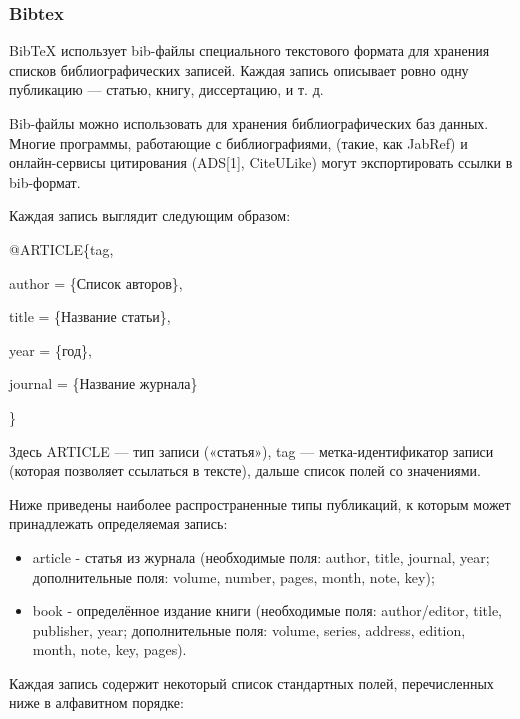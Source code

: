 \subsubsection{Bibtex}

BibTeX использует bib-файлы специального текстового формата для хранения списков библиографических записей. Каждая запись описывает ровно одну публикацию — статью, книгу, диссертацию, и т. д.

Bib-файлы можно использовать для хранения библиографических баз данных. Многие программы, работающие с библиографиями, (такие, как JabRef) и онлайн-сервисы цитирования (ADS[1], CiteULike) могут экспортировать ссылки в bib-формат.

Каждая запись выглядит следующим образом:

@ARTICLE\{tag, \par
	author = \{Список авторов\}, \par
	title = \{Название статьи\}, \par
	year = \{год\}, \par
	journal = \{Название журнала\} \par
\} \par

Здесь ARTICLE — тип записи («статья»), tag — метка-идентификатор записи (которая позволяет ссылаться в тексте), дальше список полей со значениями.

Ниже приведены наиболее распространенные типы публикаций, к которым может принадлежать определяемая запись:

\begin{itemize}
\item article - статья из журнала (необходимые поля: author, title, journal, year; дополнительные поля: volume, number, pages, month, note, key);
\item book - определённое издание книги (необходимые поля: author/editor, title, publisher, year; дополнительные поля: volume, series, address, edition, month, note, key, pages).
\end{itemize}

Каждая запись содержит некоторый список стандартных полей, перечисленных ниже в алфавитном порядке:

